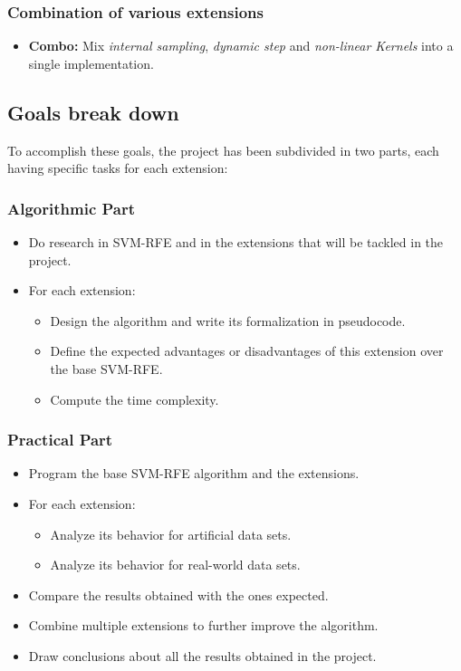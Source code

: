 \subsubsection*{Combination of various extensions}

\begin{itemize}
    \item \textbf{Combo:} Mix \emph{internal sampling}, \emph{dynamic step} and \emph{non-linear Kernels} into a single implementation.
\end{itemize}

\subsection{Goals break down}

To accomplish these goals, the project has been sub\-divided in two parts, each having specific tasks for each extension:

\subsubsection*{Algorithmic Part}

\begin{itemize}
    \item Do research in SVM-RFE and in the extensions that will be tackled in the project.
    \item {
        For each extension:
        \begin{itemize}
            \item Design the algorithm and write its formalization in pseudocode.
            \item Define the expected advantages or disadvantages of this extension over the base SVM-RFE.
            \item Compute the time complexity.
        \end{itemize}
    }
\end{itemize}

\subsubsection*{Practical Part}

\begin{itemize}
    \item Program the base SVM-RFE algorithm and the extensions.
    \item {
        For each extension:
        \begin{itemize}
            \item Analyze its behavior for artificial data sets.
            \item Analyze its behavior for real-world data sets.
        \end{itemize}
    }
    \item Compare the results obtained with the ones expected.
    \item Combine multiple extensions to further improve the algorithm.
    \item Draw conclusions about all the results obtained in the project.
\end{itemize}

